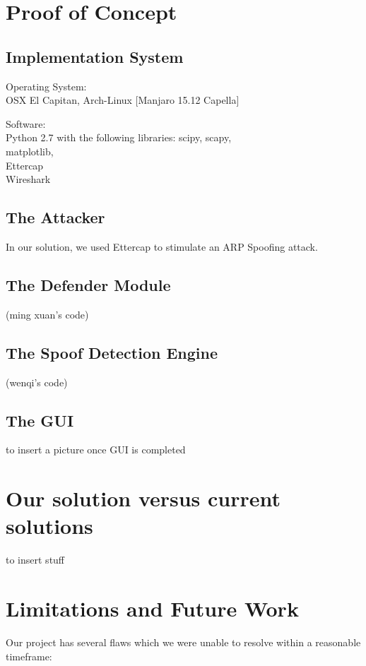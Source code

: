 \documentclass{acm_proc_article-sp}
\begin{document}
\section{Proof of Concept}
\subsection{Implementation System}
Operating System: \\
OSX El Capitan, Arch-Linux [Manjaro 15.12 Capella]

Software: \\
Python 2.7 with the following libraries: scipy, scapy, \\matplotlib, \\ Ettercap \\ Wireshark
\subsection{The Attacker}
In our solution, we used Ettercap to stimulate an ARP Spoofing attack. 

\subsection{The Defender Module}

(ming xuan's code) 

\subsection{The Spoof Detection Engine}

(wenqi's code)

\subsection{The GUI}

to insert a picture once GUI is completed

\section{Our solution versus current \\solutions}
to insert stuff 

\section{Limitations and Future Work}
Our project has several flaws which we were unable to resolve within a reasonable timeframe: 
\end{document}
